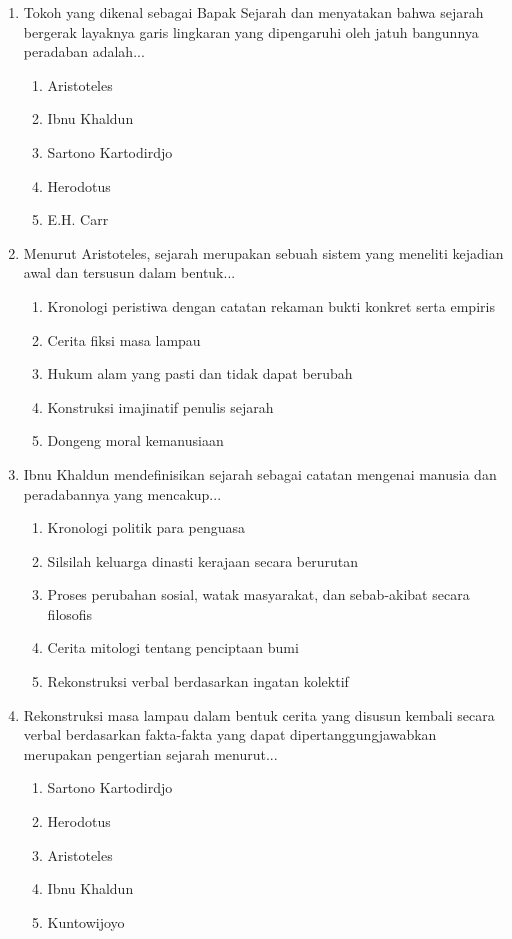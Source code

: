 \documentclass[12pt, a4paper]{article}
\begin{document}
\begin{enumerate}[label=\arabic*.]
    \item Tokoh yang dikenal sebagai Bapak Sejarah dan menyatakan bahwa sejarah bergerak layaknya garis lingkaran yang dipengaruhi oleh jatuh bangunnya peradaban adalah...
    \begin{enumerate}[label=\Alph*.]
        \item Aristoteles
        \item Ibnu Khaldun
        \item Sartono Kartodirdjo
        \item Herodotus
        \item E.H. Carr
    \end{enumerate}

    \item Menurut Aristoteles, sejarah merupakan sebuah sistem yang meneliti kejadian awal dan tersusun dalam bentuk...
    \begin{enumerate}[label=\Alph*.]
        \item Kronologi peristiwa dengan catatan rekaman bukti konkret serta empiris
        \item Cerita fiksi masa lampau
        \item Hukum alam yang pasti dan tidak dapat berubah
        \item Konstruksi imajinatif penulis sejarah
        \item Dongeng moral kemanusiaan
    \end{enumerate}

    \item Ibnu Khaldun mendefinisikan sejarah sebagai catatan mengenai manusia dan peradabannya yang mencakup...
    \begin{enumerate}[label=\Alph*.]
        \item Kronologi politik para penguasa
        \item Silsilah keluarga dinasti kerajaan secara berurutan
        \item Proses perubahan sosial, watak masyarakat, dan sebab-akibat secara filosofis
        \item Cerita mitologi tentang penciptaan bumi
        \item Rekonstruksi verbal berdasarkan ingatan kolektif
    \end{enumerate}

    \item Rekonstruksi masa lampau dalam bentuk cerita yang disusun kembali secara verbal berdasarkan fakta-fakta yang dapat dipertanggungjawabkan merupakan pengertian sejarah menurut...
    \begin{enumerate}[label=\Alph*.]
        \item Sartono Kartodirdjo
        \item Herodotus
        \item Aristoteles
        \item Ibnu Khaldun
        \item Kuntowijoyo
    \end{enumerate}


\end{enumerate}
\end{document}
